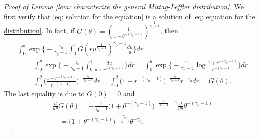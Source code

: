 \documentclass[12pt, a4paper]{amsart}
\theoremstyle{definition}
\numberwithin{equation}{section}
\begin{document}
\begin{proof}[Proof of Lemma \ref{lem: characterize the general Mittag-Leffler distribution}]
	
	We first verify that \eqref{eq: solution for the equation}  is a solution of \eqref{eq: equation for the distribution}.
	In fact, if $G(\theta) = (\frac{1}{1+ \theta^{-(\gamma_0 - 1)}})^{\frac{1}{\gamma_0 - 1}}$, then
\[\begin{split}
	& \int_0^\theta \exp\Big\{- \frac{\gamma_0} {\gamma_0 - 1} \int_0^1 G(ru^{\frac{1}{\gamma_0 - 1}})^{\gamma_0 - 1}\frac{du}{u}\Big\} dr
	\\&\quad = \int_0^\theta \exp\Big\{- \frac{\gamma_0} {\gamma_0 - 1} \int_0^1 \frac{du}{u+r^{-(\gamma_0 - 1)}} \Big\} dr
	= \int_0^\theta \exp\Big\{- \frac{\gamma_0} {\gamma_0 - 1} \log\frac{1+r^{-(\gamma_0 - 1)}}{r^{-(\gamma_0 - 1)} } \Big\} dr
	\\&\quad = \int_0^\theta \big(\frac{1+r^{-(\gamma_0 - 1)}}{r^{-(\gamma_0 - 1)} }\big)^{- \frac{\gamma_0} {\gamma_0 - 1}} dr
	= \int_0^\theta \big( 1 + r^{ - ( \gamma_0 - 1 ) } \big)^{- \frac{\gamma_0} {\gamma_0 - 1}} r^{-\gamma_0} dr
	= G(\theta).
\end{split}\]
	The last equality is due to $G(0) = 0$ and
\[\begin{split}
	&\frac{d}{d\theta}G(\theta)
	= - \frac{1}{\gamma_0 - 1} \big(1+\theta^{-(\gamma_0 - 1)}\big)^{- \frac{1}{\gamma_0 - 1} - 1} \frac{d}{d\theta} \theta^{-(\gamma_0 - 1)}
	\\&\quad =  \big(1+\theta^{-(\gamma_0 - 1)}\big)^{- \frac{\gamma_0}{\gamma_0 - 1} } \theta^{-\gamma_0}.
\end{split}\]
	

\end{proof}
\end{document}
